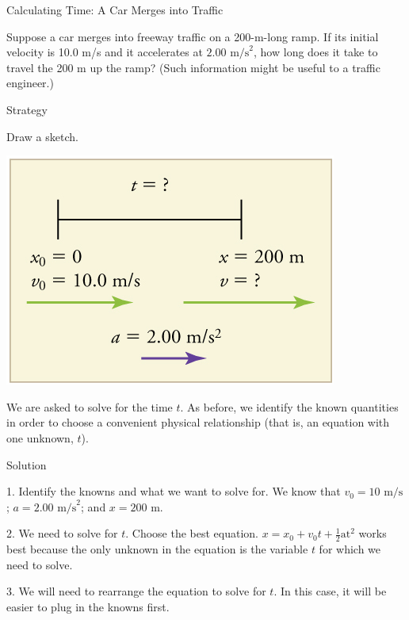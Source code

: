 \documentclass[
]{book}
\newenvironment{tinysection}{}{}
\begin{document}
\hypertarget{fs-id1164906470852}{}
Calculating Time: A Car Merges into Traffic

Suppose a car merges into freeway traffic on a 200-m-long ramp. If its
initial velocity is 10.0 m/s and it accelerates at
\({2\text{.}\text{00\ m/s}^{2}}{}\), how long does it take to travel the
200 m up the ramp? (Such information might be useful to a traffic
engineer.)

\begin{tinysection}

{Strategy}

\end{tinysection}

Draw a sketch.

\includegraphics{images/Figure_02_04_03a.jpg}

We are asked to solve for the time \(t{}\). As before, we identify the
known quantities in order to choose a convenient physical relationship
(that is, an equation with one unknown, \(t{}\)).

\begin{tinysection}

{Solution}

\end{tinysection}

1. Identify the knowns and what we want to solve for. We know that
\({v_{0} = \text{10\ m/s}}{}\); \({{a = 2}\text{.}\text{00\ m/s}^{2}}{}\);
and \({x = \text{200\ m}}{}\).

2. We need to solve for \(t{}\). Choose the best equation.
\({{x = {x_{0} + v_{0}}}{t + \frac{1}{2}}\text{at}^{2}}{}\) works best
because the only unknown in the equation is the variable \(t{}\) for which
we need to solve.

3. We will need to rearrange the equation to solve for \(t{}\). In this
case, it will be easier to plug in the knowns first.
\end{document}
